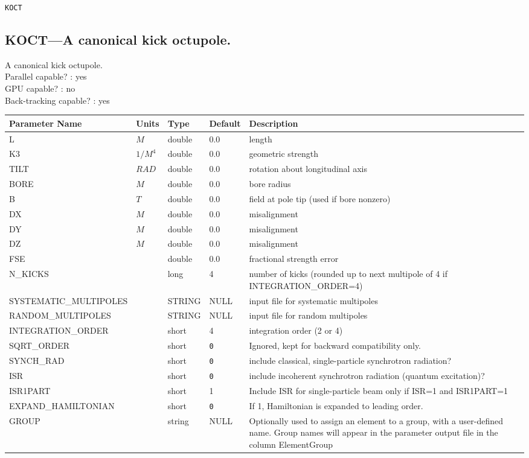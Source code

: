 \newpage
\begin{center}{\Large\verb|KOCT|}\end{center}
\subsection{KOCT---A canonical kick octupole.}
A canonical kick octupole.
\\
Parallel capable? : yes\\
GPU capable? : no\\
Back-tracking capable? : yes\\
\begin{tabular}{|l|l|l|l|p{\descwidth}|} \hline
Parameter Name & Units & Type & Default & Description \\ \hline 
L & $M$ & double &  0.0 & length  \\ \hline 
K3 & $1/M^{4}$ & double &  0.0 & geometric strength  \\ \hline 
TILT & $RAD$ & double &  0.0 & rotation about longitudinal axis  \\ \hline 
BORE & $M$ & double &  0.0 & bore radius  \\ \hline 
B & $T$ & double &  0.0 & field at pole tip (used if bore nonzero)  \\ \hline 
DX & $M$ & double &  0.0 & misalignment  \\ \hline 
DY & $M$ & double &  0.0 & misalignment  \\ \hline 
DZ & $M$ & double &  0.0 & misalignment  \\ \hline 
FSE &  & double &  0.0 & fractional strength error  \\ \hline 
N\_KICKS &  & long &   4               & number of kicks (rounded up to next multipole of 4 if INTEGRATION\_ORDER=4)  \\ \hline 
SYSTEMATIC\_MULTIPOLES &  & STRING &   NULL            & input file for systematic multipoles  \\ \hline 
RANDOM\_MULTIPOLES &  & STRING &   NULL            & input file for random multipoles  \\ \hline 
INTEGRATION\_ORDER &  & short &   4               & integration order (2 or 4)  \\ \hline 
SQRT\_ORDER &  & short &  \verb|0| & Ignored, kept for backward compatibility only.  \\ \hline 
SYNCH\_RAD &  & short &  \verb|0| & include classical, single-particle synchrotron radiation?  \\ \hline 
ISR &  & short &  \verb|0| & include incoherent synchrotron radiation (quantum excitation)?  \\ \hline 
ISR1PART &  & short &   1               & Include ISR for single-particle beam only if ISR=1 and ISR1PART=1  \\ \hline 
EXPAND\_HAMILTONIAN &  & short &  \verb|0| & If 1, Hamiltonian is expanded to leading order.  \\ \hline 
GROUP &  & string & NULL & Optionally used to assign an element to a group, with a user-defined name.  Group names will appear in the parameter output file in the column ElementGroup  \\ \hline 
\end{tabular}

